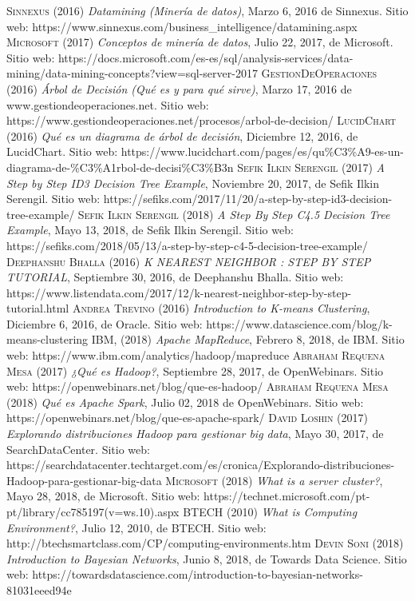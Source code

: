 \begin{thebibliography}{}
	 \textsc{Sinnexus} (2016) \textit{Datamining (Minería de datos)}, Marzo 6, 2016 de Sinnexus. Sitio web: https://www.sinnexus.com/business\_intelligence/datamining.aspx
	 \textsc{Microsoft} (2017) \textit{Conceptos de minería de datos}, Julio 22, 2017, de Microsoft. Sitio web: https://docs.microsoft.com/es-es/sql/analysis-services/data-mining/data-mining-concepts?view=sql-server-2017
	 \textsc{GestionDeOperaciones} (2016) \textit{Árbol de Decisión (Qué es y para qué sirve)}, Marzo 17, 2016 de www.gestiondeoperaciones.net. Sitio web: https://www.gestiondeoperaciones.net/procesos/arbol-de-decision/
	 \textsc{LucidChart} (2016) \textit{Qué es un diagrama de árbol de decisión}, Diciembre 12, 2016, de LucidChart. Sitio web: https://www.lucidchart.com/pages/es/qu\%C3\%A9-es-un-diagrama-de-\%C3\%A1rbol-de-decisi\%C3\%B3n
	 \textsc{Sefik Ilkin Serengil} (2017) \textit{A Step by Step ID3 Decision Tree Example}, Noviembre 20, 2017, de Sefik Ilkin Serengil. Sitio web: https://sefiks.com/2017/11/20/a-step-by-step-id3-decision-tree-example/
	 \textsc{Sefik Ilkin Serengil} (2018) \textit{A Step By Step C4.5 Decision Tree Example}, Mayo 13, 2018, de Sefik Ilkin Serengil. Sitio web: https://sefiks.com/2018/05/13/a-step-by-step-c4-5-decision-tree-example/
	 \textsc{Deephanshu Bhalla} (2016) \textit{K NEAREST NEIGHBOR : STEP BY STEP TUTORIAL}, Septiembre 30, 2016, de Deephanshu Bhalla. Sitio web: https://www.listendata.com/2017/12/k-nearest-neighbor-step-by-step-tutorial.html
	 \textsc{Andrea Trevino} (2016) \textit{Introduction to K-means Clustering}, Diciembre 6, 2016, de Oracle. Sitio web: https://www.datascience.com/blog/k-means-clustering
	 \textsc{IBM}, (2018) \textit{Apache MapReduce}, Febrero 8, 2018, de IBM. Sitio web: https://www.ibm.com/analytics/hadoop/mapreduce
	 \textsc{Abraham Requena Mesa} (2017) \textit{¿Qué es Hadoop?}, Septiembre 28, 2017, de OpenWebinars. Sitio web: https://openwebinars.net/blog/que-es-hadoop/
	 \textsc{Abraham Requena Mesa} (2018) \textit{Qué es Apache Spark}, Julio 02, 2018 de OpenWebinars. Sitio web: https://openwebinars.net/blog/que-es-apache-spark/
	 \textsc{David Loshin} (2017) \textit{Explorando distribuciones Hadoop para gestionar big data}, Mayo 30, 2017, de SearchDataCenter. Sitio web: https://searchdatacenter.techtarget.com/es/cronica/Explorando-distribuciones-Hadoop-para-gestionar-big-data
	 \textsc{Microsoft} (2018) \textit{What is a server cluster?}, Mayo 28, 2018, de Microsoft. Sitio web: https://technet.microsoft.com/pt-pt/library/cc785197(v=ws.10).aspx
	 \textsc{BTECH} (2010) \textit{What is Computing Environment?}, Julio 12, 2010, de BTECH. Sitio web: http://btechsmartclass.com/CP/computing-environments.htm
	 \textsc{Devin Soni} (2018) \textit{Introduction to Bayesian Networks}, Junio 8, 2018, de Towards Data Science. Sitio web: https://towardsdatascience.com/introduction-to-bayesian-networks-81031eeed94e
	
\end{thebibliography}
